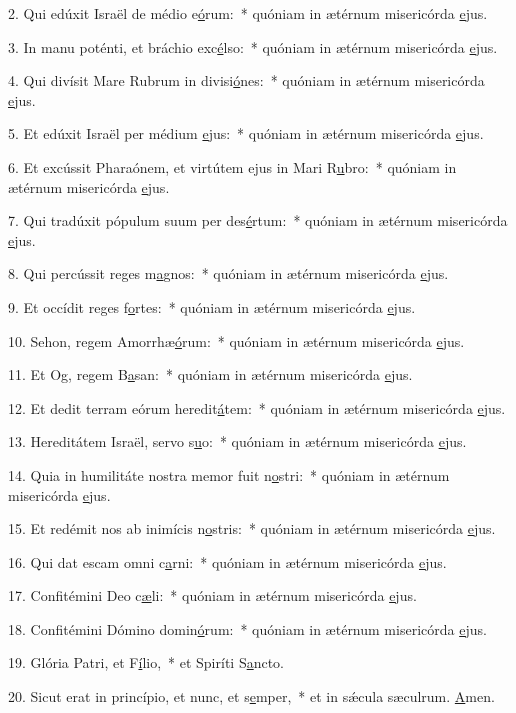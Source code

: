 2. Qui edúxit Israël de médio e\uline{ó}rum:~* quóniam in ætérnum misericórda \uline{e}jus.\par 
3. In manu poténti, et bráchio exc\uline{é}lso:~* quóniam in ætérnum misericórda \uline{e}jus.\par 
4. Qui divísit Mare Rubrum in divisi\uline{ó}nes:~* quóniam in ætérnum misericórda \uline{e}jus.\par 
5. Et edúxit Israël per médium \uline{e}jus:~* quóniam in ætérnum misericórda \uline{e}jus.\par 
6. Et excússit Pharaónem, et virtútem ejus in Mari R\uline{u}bro:~* quóniam in ætérnum misericórda \uline{e}jus.\par 
7. Qui tradúxit pópulum suum per des\uline{é}rtum:~* quóniam in ætérnum misericórda \uline{e}jus.\par 
8. Qui percússit reges m\uline{a}gnos:~* quóniam in ætérnum misericórda \uline{e}jus.\par 
9. Et occídit reges f\uline{o}rtes:~* quóniam in ætérnum misericórda \uline{e}jus.\par 
10. Sehon, regem Amorrhæ\uline{ó}rum:~* quóniam in ætérnum misericórda \uline{e}jus.\par 
11. Et Og, regem B\uline{a}san:~* quóniam in ætérnum misericórda \uline{e}jus.\par 
12. Et dedit terram eórum heredit\uline{á}tem:~* quóniam in ætérnum misericórda \uline{e}jus.\par 
13. Hereditátem Israël, servo s\uline{u}o:~* quóniam in ætérnum misericórda \uline{e}jus.\par 
14. Quia in humilitáte nostra memor fuit n\uline{o}stri:~* quóniam in ætérnum misericórda \uline{e}jus.\par 
15. Et redémit nos ab inimícis n\uline{o}stris:~* quóniam in ætérnum misericórda \uline{e}jus.\par 
16. Qui dat escam omni c\uline{a}rni:~* quóniam in ætérnum misericórda \uline{e}jus.\par 
17. Confitémini Deo c\uline{æ}li:~* quóniam in ætérnum misericórda \uline{e}jus.\par 
18. Confitémini Dómino domin\uline{ó}rum:~* quóniam in ætérnum misericórda \uline{e}jus.\par 
19. Glória Patri, et F\uline{í}lio,~* et Spiríti S\uline{a}ncto.\par 
20. Sicut erat in princípio, et nunc, et s\uline{e}mper,~* et in sǽcula sæculrum. \uline{A}men.\par 
